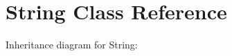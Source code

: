 \hypertarget{classString}{}\section{String Class Reference}
\label{classString}


Inheritance diagram for String\+:
